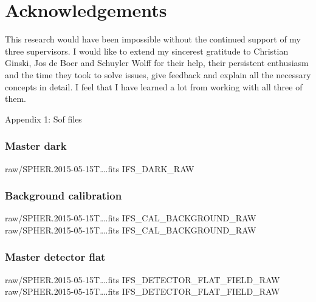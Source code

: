 \documentclass[twoside,single,12pt]{lion-msc}
\begin{document}
\clearpage
\section*{Acknowledgements}
\small
This research would have been impossible without the continued support of my three supervisors. I would like to extend my sincerest gratitude to Christian Ginski, Jos de Boer and Schuyler Wolff for their help, their persistent enthusiasm and the time they took to solve issues, give feedback and explain all the necessary concepts in detail. I feel that I have learned a lot from working with all three of them.

\clearpage



\clearpage
\huge{Appendix 1: Sof files}
\small
\subsubsection*{Master dark}
\begin{mdframed}[linewidth = 0.3mm, linecolor = black]
raw/SPHER.2015-05-15T\dots.fits IFS\_DARK\_RAW
\end{mdframed}

\subsubsection*{Background calibration}
\begin{mdframed}[linewidth = 0.3mm, linecolor = black]
raw/SPHER.2015-05-15T\dots.fits IFS\_CAL\_BACKGROUND\_RAW\\
raw/SPHER.2015-05-15T\dots.fits IFS\_CAL\_BACKGROUND\_RAW
\end{mdframed}

\subsubsection*{Master detector flat}
\begin{mdframed}[linewidth = 0.3mm, linecolor = black]
raw/SPHER.2015-05-15T\dots.fits IFS\_DETECTOR\_FLAT\_FIELD\_RAW\\
raw/SPHER.2015-05-15T\dots.fits IFS\_DETECTOR\_FLAT\_FIELD\_RAW
\end{mdframed}
\end{document}
